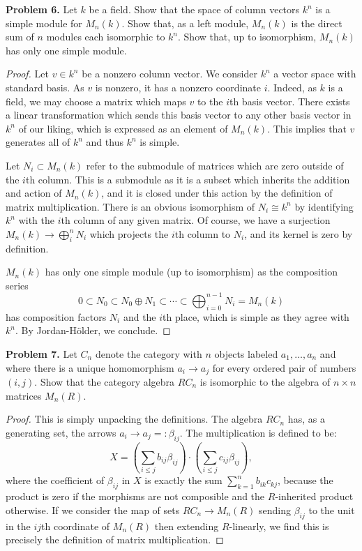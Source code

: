 \documentclass[reqno]{amsart}
\theoremstyle{definition}
\theoremstyle{remark}
\newcommand{\prob}[1] {
  \textbf{Problem #1.}
}
\begin{document}
\prob{6} Let $k$ be a field. Show that the space of column vectors $k^n$ is a
simple module for $M_n(k)$. Show that, as a left module, $M_n(k)$ is the direct
sum of $n$ modules each isomorphic to $k^n$. Show that, up to isomorphism,
$M_n(k)$ has only one simple module.

\begin{proof}
  Let $v \in k^n$ be a nonzero column vector. We consider $k^n$ a vector space
  with standard basis. As $v$ is nonzero, it has a nonzero coordinate $i$.
  Indeed, as $k$ is a field, we may choose a matrix which maps $v$ to the $i$th
  basis vector. There exists a linear transformation which sends this basis
  vector to any other basis vector in $k^n$ of our liking, which is expressed as
  an element of $M_n(k)$. This implies that $v$ generates all of $k^n$ and thus
  $k^n$ is simple.

  Let $N_i \subset M_n(k)$ refer to the submodule of matrices which are zero
  outside of the $i$th column. This is a submodule as it is a subset which
  inherits the addition and action of $M_n(k)$, and it is closed under this
  action by the definition of matrix multiplication. There is an obvious
  isomorphism of $N_i \cong k^n$ by identifying $k^n$ with the $i$th column of
  any given matrix. Of course, we have a surjection $M_n(k) \to \bigoplus_i^n
  N_i$ which projects the $i$th column to $N_i$, and its kernel is zero by
  definition.

  $M_n(k)$ has only one simple module (up to isomorphism) as the composition
  series
  \[
    0 \subset N_0 \subset N_0 \oplus N_1 \subset \cdots \subset
    \bigoplus_{i=0}^{n-1} N_i = M_n(k)
  \]
  has composition factors $N_i$ and the $i$th place, which is simple as they
  agree with $k^n$. By Jordan-Hölder, we conclude.
\end{proof}

\prob{7} Let $C_n$ denote the category with $n$ objects labeled $a_1, \dots,
a_n$ and where there is a unique homomorphism $a_i \to a_j$ for every ordered
pair of numbers $(i, j)$. Show that the category algebra $RC_n$ is isomorphic to
the algebra of $n \times n$ matrices $M_n(R)$.

\begin{proof}
  This is simply unpacking the definitions. The algebra $RC_n$ has, as a
  generating set, the arrows $a_i \to a_j =: \beta_{ij}$. The multiplication is
  defined to be:
  \[
    X = \left(\sum_{i \leq j} b_{ij} \beta_{ij}\right) \cdot \left(\sum_{i \leq
        j} c_{ij} \beta_{ij}\right),
  \]
  where the coefficient of $\beta_{ij}$ in $X$ is exactly the sum $\sum_{k=1}^n
  b_{ik} c_{kj}$, because the product is zero if the morphisms are not
  composible and the $R$-inherited product otherwise. If we consider the map of
  sets $RC_n \to M_n(R)$ sending $\beta_{ij}$ to the unit in the $ij$th
  coordinate of $M_n(R)$ then extending $R$-linearly, we find this is precisely
  the definition of matrix multiplication.
\end{proof}
\end{document}
